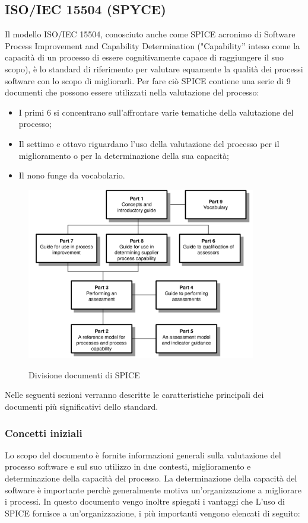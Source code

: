 \documentclass[../piano-di-qualifica.tex]{subfiles}
\begin{document}
\subsection{ISO/IEC 15504 (SPYCE)}%
\label{sec:iso/iec_15504_spyce}
Il modello ISO/IEC 15504, conosciuto anche come SPICE acronimo di Software Process Improvement and Capability Determination ("Capability” inteso come la capacità di un processo di essere cognitivamente capace di raggiungere il suo scopo), è lo standard di riferimento per valutare equamente la qualità dei processi software con lo scopo di migliorarli.
Per fare ciò SPICE contiene una serie di 9 documenti che possono essere utilizzati nella valutazione del processo:
\begin{itemize}
    \item I primi 6 si concentrano sull'affrontare varie tematiche della valutazione del processo;
    \item Il settimo e ottavo riguardano l'uso della valutazione del processo per il miglioramento o per la determinazione della sua capacità;
    \item Il nono funge da vocabolario.
\end{itemize}

\begin{figure}[H]
    \centering
    \includegraphics[width=10cm]{img/spice_doc.png}
    \label{fig:scice_documenti}
    \caption{Divisione documenti di SPICE}
\end{figure}


Nelle seguenti sezioni verranno descritte le caratteristiche principali dei documenti più significativi dello standard.

\subsubsection{Concetti iniziali}
\label{sub:concetti_iniziali}
Lo scopo del documento è fornite informazioni generali sulla valutazione del processo software e sul suo utilizzo in due contesti, miglioramento e determinazione della capacità del processo.
La determinazione della capacità del software è importante perchè generalmente motiva un'organizzazione a migliorare i processi.
In questo documento vengo inoltre spiegati i vantaggi che L'uso di SPICE fornisce a un'organizzazione, i più importanti vengono elencati di seguito:
\end{document}
